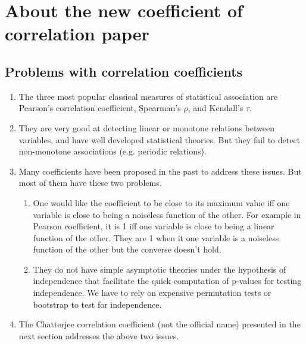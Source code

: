 \chapter{About the new coefficient of correlation paper}

\section{Problems with correlation coefficients}
\begin{enumerate}
    \item The three most popular classical measures of statistical association are Pearson's correlation coefficient, Spearman's $\rho$, and Kendall's $\tau$.
    \item They are very good at detecting linear or monotone relations between variables, and  have well developed statistical theories. But they fail to detect non-monotone associations (e.g. periodic relations).
    \item Many coefficients have been proposed in the past to address these issues. But most of them have these two problems.
    
    \begin{enumerate}
        \item One would like the coefficient to be close to its maximum value iff one variable is close to being a noiseless function of the other. For example in Pearson coefficient, it is 1 iff one variable is close to being a linear function of the other. They are 1 when it one variable is a noiseless function of the other but the converse doesn't hold.
        \item They do not have simple asymptotic theories under the hypothesis of independence that facilitate the quick computation of p-values for testing independence. We have to rely on expensive permutation tests or bootstrap to test for independence.
    \end{enumerate}
    \item The Chatterjee correlation coefficient (not the official name) presented in the next section addresses the above two issues.
\end{enumerate}    

